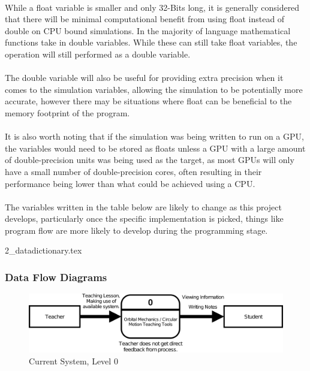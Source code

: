 \paragraph{} 
While a float variable is smaller and only 32-Bits long, it is generally considered that there will be minimal computational benefit from using float instead of double on CPU bound simulations. In the majority of language mathematical functions take in double variables. While these can still take float variables, the operation will still performed as a double variable.

\paragraph{}
The double variable will also be useful for providing extra precision when it comes to the simulation variables, allowing the simulation to be potentially more accurate, however there may be situations where float can be beneficial to the memory footprint of the program.

\paragraph{}
It is also worth noting that if the simulation was being written to run on a GPU, the variables would need to be stored as floats unless a GPU with a large amount of double-precision units was being used as the target, as most GPUs will only have a small number of double-precision cores, often resulting in their performance being lower than what could be achieved using a CPU.

\paragraph{}
The variables written in the table below are likely to change as this project develops, particularly once the specific implementation is picked, things like program flow are more likely to develop during the programming stage.

{2_datadictionary.tex}

\pagebreak

\subsubsection{Data Flow Diagrams}

\begin{figure}[!ht]
  \centering
  \includegraphics[width=\textwidth]{img/csl0.png}
  \caption{Current System, Level 0}
\end{figure}

